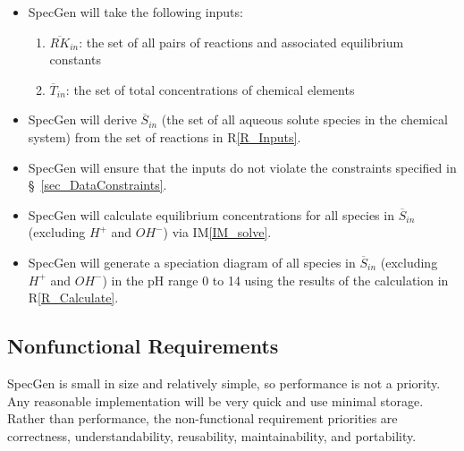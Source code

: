 \documentclass[12pt]{article}
\newcommand{\iref}[1]{IM\ref{#1}}
\newcounter{reqnum} %
\newcommand{\rref}[1]{R\ref{#1}}
\newcommand{\sref}[1]{\S~\ref{#1}}
\newcommand{\progname}{SpecGen} %
\begin{document}
\noindent \begin{itemize}

\item[R\refstepcounter{reqnum}\thereqnum \label{R_Inputs}:] \progname{} will 
  take the following inputs:
  \begin{enumerate} \item $\overline{RK}_{in}$: the set of all pairs of reactions and 
                      associated equilibrium constants 
                    \item $\overline{T}_{in}$: the set of total concentrations of chemical 
                      elements
  \end{enumerate}

\item[R\refstepcounter{reqnum}\thereqnum \label{R_DerivedInputs}:] \progname{} 
  will derive $\overline{S}_{in}$ (the set of all aqueous solute species in the chemical 
  system) from the set of reactions in \rref{R_Inputs}.

\item[R\refstepcounter{reqnum}\thereqnum \label{R_ValidateInputs}:] \progname{} 
  will ensure that the inputs do not violate the constraints specified in 
  \sref{sec_DataConstraints}.

\item[R\refstepcounter{reqnum}\thereqnum \label{R_Calculate}:] \progname{} will 
  calculate equilibrium concentrations for all species in $\overline{S}_{in}$ (excluding 
  $H^+$ and $OH^-$) via \iref{IM_solve}.

\item[R\refstepcounter{reqnum}\thereqnum \label{R_Output}:] \progname{} will 
  generate a speciation diagram of all species in $\overline{S}_{in}$ (excluding $H^+$ and 
  $OH^-$) in the pH range 0 to 14 using the results of the calculation in 
  \rref{R_Calculate}.

\end{itemize}


\subsection{Nonfunctional Requirements}

\progname{} is small in size and relatively simple, so performance is not a 
priority. Any reasonable implementation will be very quick and use minimal 
storage. Rather than performance, the non-functional requirement priorities 
are correctness, understandability, reusability, maintainability, and 
portability. 
\end{document}
